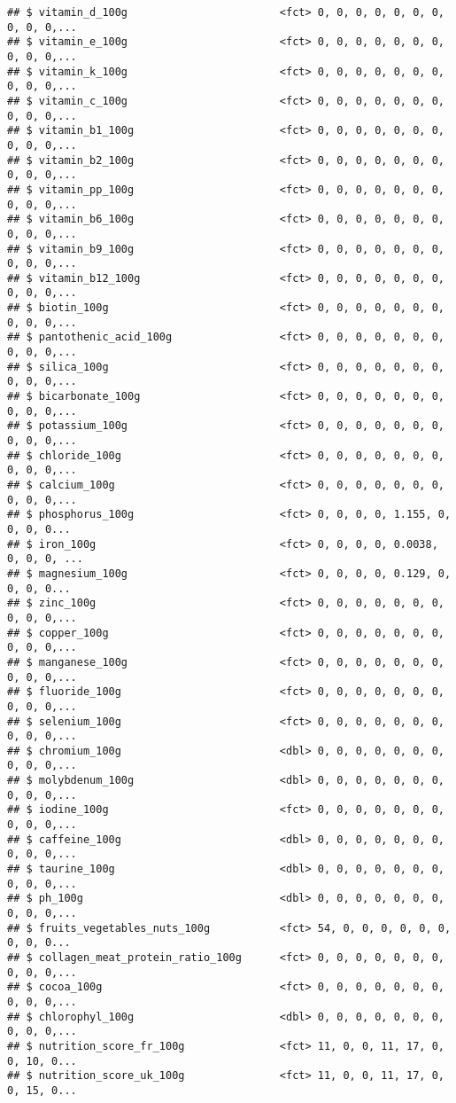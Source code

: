 \documentclass[]{article}
\begin{document}
\begin{verbatim}
## $ vitamin_d_100g                        <fct> 0, 0, 0, 0, 0, 0, 0, 0, 0, 0,...
## $ vitamin_e_100g                        <fct> 0, 0, 0, 0, 0, 0, 0, 0, 0, 0,...
## $ vitamin_k_100g                        <fct> 0, 0, 0, 0, 0, 0, 0, 0, 0, 0,...
## $ vitamin_c_100g                        <fct> 0, 0, 0, 0, 0, 0, 0, 0, 0, 0,...
## $ vitamin_b1_100g                       <fct> 0, 0, 0, 0, 0, 0, 0, 0, 0, 0,...
## $ vitamin_b2_100g                       <fct> 0, 0, 0, 0, 0, 0, 0, 0, 0, 0,...
## $ vitamin_pp_100g                       <fct> 0, 0, 0, 0, 0, 0, 0, 0, 0, 0,...
## $ vitamin_b6_100g                       <fct> 0, 0, 0, 0, 0, 0, 0, 0, 0, 0,...
## $ vitamin_b9_100g                       <fct> 0, 0, 0, 0, 0, 0, 0, 0, 0, 0,...
## $ vitamin_b12_100g                      <fct> 0, 0, 0, 0, 0, 0, 0, 0, 0, 0,...
## $ biotin_100g                           <fct> 0, 0, 0, 0, 0, 0, 0, 0, 0, 0,...
## $ pantothenic_acid_100g                 <fct> 0, 0, 0, 0, 0, 0, 0, 0, 0, 0,...
## $ silica_100g                           <fct> 0, 0, 0, 0, 0, 0, 0, 0, 0, 0,...
## $ bicarbonate_100g                      <fct> 0, 0, 0, 0, 0, 0, 0, 0, 0, 0,...
## $ potassium_100g                        <fct> 0, 0, 0, 0, 0, 0, 0, 0, 0, 0,...
## $ chloride_100g                         <fct> 0, 0, 0, 0, 0, 0, 0, 0, 0, 0,...
## $ calcium_100g                          <fct> 0, 0, 0, 0, 0, 0, 0, 0, 0, 0,...
## $ phosphorus_100g                       <fct> 0, 0, 0, 0, 1.155, 0, 0, 0, 0...
## $ iron_100g                             <fct> 0, 0, 0, 0, 0.0038, 0, 0, 0, ...
## $ magnesium_100g                        <fct> 0, 0, 0, 0, 0.129, 0, 0, 0, 0...
## $ zinc_100g                             <fct> 0, 0, 0, 0, 0, 0, 0, 0, 0, 0,...
## $ copper_100g                           <fct> 0, 0, 0, 0, 0, 0, 0, 0, 0, 0,...
## $ manganese_100g                        <fct> 0, 0, 0, 0, 0, 0, 0, 0, 0, 0,...
## $ fluoride_100g                         <fct> 0, 0, 0, 0, 0, 0, 0, 0, 0, 0,...
## $ selenium_100g                         <fct> 0, 0, 0, 0, 0, 0, 0, 0, 0, 0,...
## $ chromium_100g                         <dbl> 0, 0, 0, 0, 0, 0, 0, 0, 0, 0,...
## $ molybdenum_100g                       <dbl> 0, 0, 0, 0, 0, 0, 0, 0, 0, 0,...
## $ iodine_100g                           <fct> 0, 0, 0, 0, 0, 0, 0, 0, 0, 0,...
## $ caffeine_100g                         <dbl> 0, 0, 0, 0, 0, 0, 0, 0, 0, 0,...
## $ taurine_100g                          <dbl> 0, 0, 0, 0, 0, 0, 0, 0, 0, 0,...
## $ ph_100g                               <dbl> 0, 0, 0, 0, 0, 0, 0, 0, 0, 0,...
## $ fruits_vegetables_nuts_100g           <fct> 54, 0, 0, 0, 0, 0, 0, 0, 0, 0...
## $ collagen_meat_protein_ratio_100g      <fct> 0, 0, 0, 0, 0, 0, 0, 0, 0, 0,...
## $ cocoa_100g                            <fct> 0, 0, 0, 0, 0, 0, 0, 0, 0, 0,...
## $ chlorophyl_100g                       <dbl> 0, 0, 0, 0, 0, 0, 0, 0, 0, 0,...
## $ nutrition_score_fr_100g               <fct> 11, 0, 0, 11, 17, 0, 0, 10, 0...
## $ nutrition_score_uk_100g               <fct> 11, 0, 0, 11, 17, 0, 0, 15, 0...
\end{verbatim}
\end{document}
